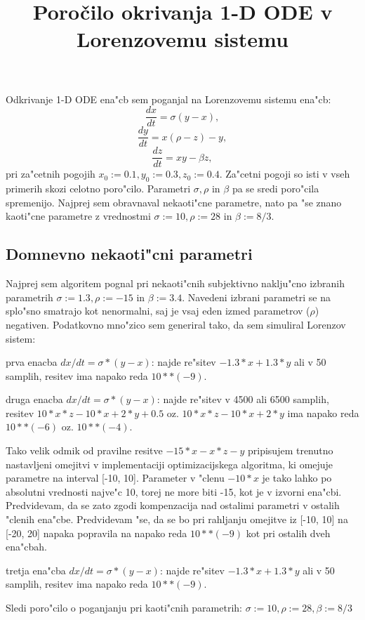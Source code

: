\documentclass[10pt,a4paper]{article}
\title{Poročilo okrivanja 1-D ODE v Lorenzovemu sistemu}
\begin{document}
	\maketitle
    
Odkrivanje 1-D ODE ena"cb sem poganjal na Lorenzovemu sistemu ena"cb:
$$
\frac{dx}{dt} = \sigma (y-x),
$$ $$
\frac{dy}{dt} = x(\rho-z) - y,
$$ $$
\frac{dz}{dt} = xy - \beta z,
$$
pri za"cetnih pogojih $x_0:=0.1, y_0:=0.3, z_0:=0.4$.
Za"cetni pogoji so isti v vseh primerih skozi celotno poro"cilo.
Parametri $\sigma, \rho$ in $\beta$ pa se sredi poro"cila
spremenijo. Najprej sem obravnaval nekaoti"cne parametre, nato 
pa "se znano kaoti"cne parametre z vrednostmi
$\sigma:=10, \rho:=28$ in $\beta:=8/3$.

\subsection{Domnevno nekaoti"cni parametri}
Najprej sem algoritem pognal pri nekaoti"cnih subjektivno naklju"cno izbranih parametrih
$\sigma:=1.3, \rho:=-15$ in $\beta:=3.4$.
Navedeni izbrani parametri se na splo"sno smatrajo kot nenormalni, saj je vsaj eden izmed parametrov
($\rho$) negativen.
Podatkovno mno"zico sem generiral tako, da sem simuliral Lorenzov sistem:

prva enacba  $dx/dt = \sigma*(y-x)$: najde re"sitev 
$ -1.3*x + 1.3*y$ ali 
v 50 samplih, resitev ima napako reda $10**(-9)$.


druga enacba  $dx/dt = \sigma*(y-x)$: najde re"sitev v 4500 ali 6500 samplih, resitev 
$10*x*z -10*x +2*y +0.5$ oz. $10*x*z -10*x +2*y$ ima napako
reda $10**(-6)$ oz. $10**(-4)$. 

Tako velik odmik od pravilne resitve  
$-15*x-x*z-y$ pripisujem trenutno nastavljeni omejitvi v implementaciji optimizacijskega
algoritma, ki omejuje parametre na interval [-10, 10]. Parameter v "clenu $-10*x$ je tako
lahko po absolutni vrednosti najve"c 10, torej ne more biti -15, kot je v izvorni ena"cbi.
Predvidevam, da se zato zgodi kompenzacija nad ostalimi parametri v ostalih "clenih ena"cbe.
Predvidevam "se, da se bo pri rahljanju omejitve iz [-10, 10] na [-20, 20] napaka popravila
na napako reda $10**(-9)$ kot pri ostalih dveh ena"cbah.

tretja ena"cba  $dx/dt = \sigma*(y-x)$: najde re"sitev 
$ -1.3*x + 1.3*y$ ali 
v 50 samplih, resitev ima napako
reda $10**(-9)$.

Sledi poro"cilo o poganjanju pri kaoti"cnih parametrih:
$\sigma:=10, \rho:=28, \beta:=8/3$
\end{document}
